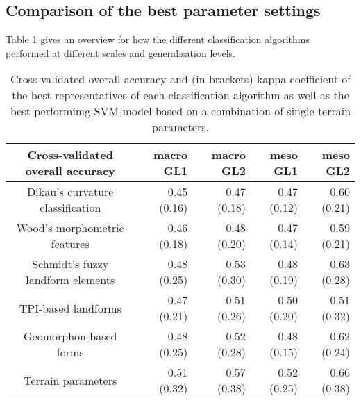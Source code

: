 \documentclass[preprint,12pt,authoryear]{elsarticle}
\begin{document}
\subsection{Comparison of the best parameter settings}
Table \ref{table:overall_comparison} gives an overview for how the different classification algorithms performed at different scales and generalisation levels.

\begin{table}[ht]
\caption{Cross-validated overall accuracy and (in brackets) kappa coefficient of the best representatives of each classification algorithm as well as the best performimg SVM-model based on a combination of single terrain parameters. }
\centering
\begin{tabular}{crrrr}
  \hline
Cross-validated overall accuracy & macro GL1 & macro GL2 & meso GL1 & meso GL2 \\ 
  \hline 
Dikau's curvature classification & 0.45 (0.16) & 0.47 (0.18) & 0.47 (0.12) & 0.60 (0.21) \\ 
  Wood's morphometric features & 0.46 (0.18) & 0.48 (0.20) & 0.47 (0.14) & 0.59 (0.21) \\ 
  Schmidt's fuzzy landform elements & 0.48 (0.25) & 0.53 (0.30) & 0.48 (0.19) & 0.63 (0.28) \\ 
  TPI-based landforms & 0.47 (0.21) & 0.51 (0.26) & 0.50 (0.20) & 0.51 (0.32) \\ 
  Geomorphon-based forms & 0.48 (0.25) & 0.52 (0.28) & 0.48 (0.15) & 0.62 (0.24) \\ 
  Terrain parameters & 0.51 (0.32) & 0.57 (0.38) & 0.52 (0.25) & 0.66 (0.38) \\ 
   \hline
\end{tabular}
\label{table:overall_comparison}
\end{table}
\end{document}
